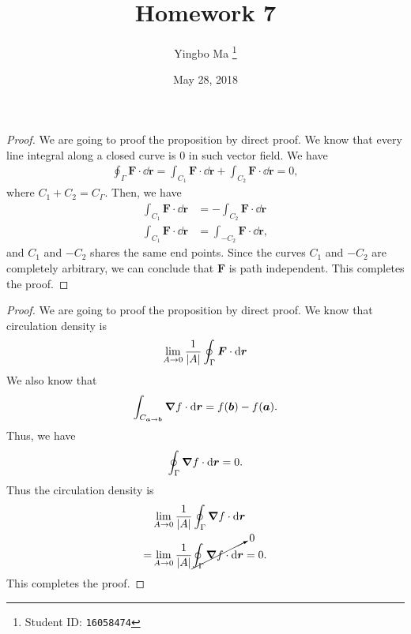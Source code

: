 \documentclass[8pt,twocolumn]{article}
\author{Yingbo Ma \thanks{Student ID: \tt{16058474}}}
\title{\vspace{-1.cm}Homework 7}
\date{May 28, 2018}
\begin{document}
\maketitle

\begin{Answer}[number=38]
  \begin{proof}
    We are going to proof the proposition by direct proof. We know that every
    line integral along a closed curve is $0$ in such vector field. We have
    \begin{align*}
      \oint_{\Gamma} \bm{F}\cdot \dd{\bm{r}} = \int_{C_1} \bm{F}\cdot \dd{\bm{r}} + \int_{C_2}
      \bm{F}\cdot \dd{\bm{r}} = 0,
    \end{align*}
    where $C_1 + C_2 = C_\Gamma$. Then, we have
    \begin{align*}
      \int_{C_1}\bm{F}\cdot \dd{\bm{r}} &= -\int_{C_2}\bm{F}\cdot \dd{\bm{r}} \\
      \int_{C_1}\bm{F}\cdot \dd{\bm{r}} &= \int_{-C_2}\bm{F}\cdot \dd{\bm{r}},
    \end{align*}
    and $C_1$ and $-C_2$ shares the same end points. Since the curves $C_1$ and
    $-C_2$ are completely arbitrary, we can conclude that $\bm{F}$ is path
    independent. This completes the proof.
  \end{proof}
\end{Answer}

\begin{Answer}[number=39]
  \begin{proof}
    We are going to proof the proposition by direct proof. We know that
    circulation density is
    \begin{align*}
      \lim_{A\to 0}{\frac{1}{\abs{A}}}\oint_{\Gamma}\bm{F} \cdot \dd{\bm{r}}
    \end{align*}
    We also know that
    \begin{align*}
      \int_{C_{\bm{a}\to \bm{b}}} \grad f \cdot\dd{\bm{r}} = f(\bm{b}) -
      f(\bm{a}).
    \end{align*}
    Thus, we have
    \begin{align*}
      \oint_{\Gamma} \grad f \cdot\dd{\bm{r}} = 0.
    \end{align*}
    Thus the circulation density is
    \begin{align*}
      &\lim_{A\to 0}{\frac{1}{\abs{A}}}\oint_{\Gamma}\grad f \cdot \dd{\bm{r}} \\
      =&\lim_{A\to 0}{\frac{1}{\abs{A}}}\cancelto{0}{\oint_{\Gamma}\grad f \cdot
      \dd{\bm{r}}} = 0.
    \end{align*}
    This completes the proof.
  \end{proof}
\end{Answer}
\end{document}
